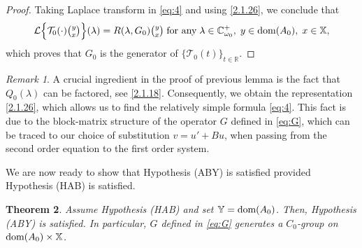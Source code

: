 \documentclass[11pt]{amsart}
\numberwithin{equation}{section}
\newcommand\R{\mathbb R}
\newtheorem{theorem}{Theorem}[section]
\theoremstyle{remark}
\newtheorem{remark}[theorem]{Remark}
\theoremstyle{definition}
\newcommand\cT{{\mathcal T}}
\newcommand\bX{{\mathbb X}}
\newcommand\bY{{\mathbb Y}}
\newcommand{\dom}{\text{\rm{dom}}}
\begin{document}
\begin{proof}
	Taking Laplace transform in \eqref{eq:4} and using \eqref{2.1.26}, we conclude that
	\begin{equation}\label{2.1.27}
		\mathcal{L}\Bigl\{\cT_0(\cdot)\tbinom{y}{x}\Bigr\}(\lambda)=R(\lambda,G_0)\tbinom{y}{x}
		\;\mbox{for any}\;\lambda\in\mathbb{C}_{\omega_0}^+,\;y\in\dom(A_0),\;x\in\bX,
	\end{equation}
	which proves that $G_0$ is the generator of $\{\cT_0(t)\}_{t\in\R}$.
\end{proof}
\begin{remark}\label{r2.2-new}
	A crucial ingredient in the proof of previous lemma is the fact that $Q_0(\lambda)$ can be factored, see \eqref{2.1.18}. Consequently, we obtain the representation \eqref{2.1.26}, which allows us to find the relatively simple formula \eqref{eq:4}. This fact is due to the block-matrix structure of the operator $G$ defined in \eqref{eq:G}, which can be traced to our choice of substitution $v=u'+Bu$, when passing from the second order equation to the first order system. 
\end{remark}	
We are now ready to show that Hypothesis (ABY) is satisfied provided Hypothesis (HAB) is satisfied. 
\begin{theorem}\label{t2.3}
Assume Hypothesis \emph{(HAB)} and set $\bY=\dom(A_0)$. Then,  Hypothesis \textnormal{(ABY)} is satisfied. In particular, $G$ defined in \eqref{eq:G} generates a $C_0$-group on $\dom(A_0)\times\bX$.
\end{theorem}
\end{document}
